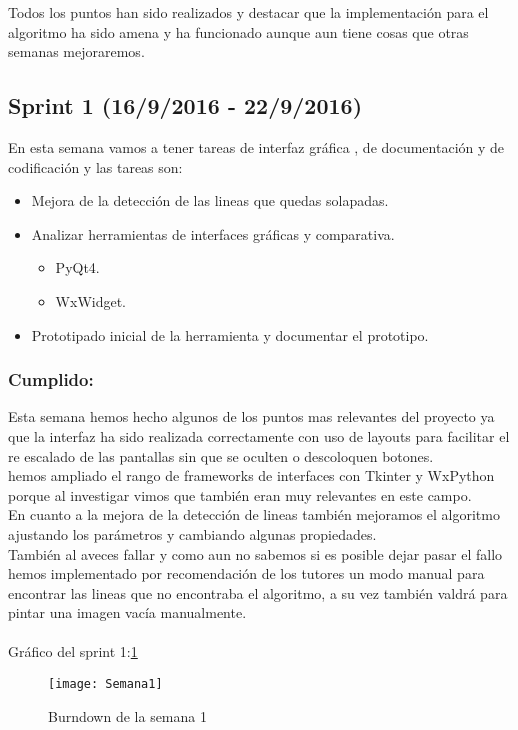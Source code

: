 Todos los puntos han sido realizados y destacar que la implementación para el algoritmo ha sido amena y ha funcionado aunque aun tiene cosas que otras semanas mejoraremos.

\subsection{Sprint 1 (16/9/2016 - 22/9/2016)}
 En esta semana vamos a tener tareas de interfaz gráfica , de documentación y de codificación y las tareas son:

\begin{itemize}
\item Mejora de la detección de las lineas que quedas solapadas. 
\item Analizar herramientas de interfaces gráficas y comparativa.
	\begin{itemize}
	\item PyQt4. 
	\item WxWidget.
	\end{itemize}
\item Prototipado inicial de la herramienta y documentar el prototipo.
\end{itemize}



\subsubsection{Cumplido:}
Esta semana hemos hecho algunos de los puntos mas relevantes del proyecto ya que la interfaz ha sido realizada correctamente con uso de layouts para facilitar el re escalado de las pantallas sin que se oculten o descoloquen botones.\\
hemos ampliado el rango de frameworks de interfaces con Tkinter y WxPython porque al investigar vimos que también eran muy relevantes en este campo.\\
En cuanto a la mejora de la detección de lineas también mejoramos el algoritmo ajustando los parámetros y cambiando algunas propiedades.\\
También al aveces fallar y como aun no sabemos si es posible dejar pasar el fallo hemos implementado por recomendación de los tutores un modo manual para encontrar las lineas que no encontraba el algoritmo, a su vez también valdrá para pintar una imagen vacía manualmente.\\\\
Gráfico del sprint 1:\ref{fig:A.2.1}
\begin{figure}[h]
\centering
\texttt{[image: Semana1]}
\caption{Burndown de la semana 1}
\label{fig:A.2.1}
\end{figure}

